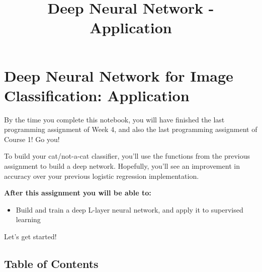 \documentclass[11pt]{article}
\title{Deep Neural Network - Application}
\providecommand{\tightlist}{%
      \setlength{\itemsep}{0pt}\setlength{\parskip}{0pt}}
\begin{document}
    
    \maketitle
    
    

    
    \hypertarget{deep-neural-network-for-image-classification-application}{%
\section{Deep Neural Network for Image Classification:
Application}\label{deep-neural-network-for-image-classification-application}}

By the time you complete this notebook, you will have finished the last
programming assignment of Week 4, and also the last programming
assignment of Course 1! Go you!

To build your cat/not-a-cat classifier, you'll use the functions from
the previous assignment to build a deep network. Hopefully, you'll see
an improvement in accuracy over your previous logistic regression
implementation.

\textbf{After this assignment you will be able to:}

\begin{itemize}
\tightlist
\item
  Build and train a deep L-layer neural network, and apply it to
  supervised learning
\end{itemize}

Let's get started!

    \hypertarget{table-of-contents}{%
\subsection{Table of Contents}\label{table-of-contents}}
\end{document}

